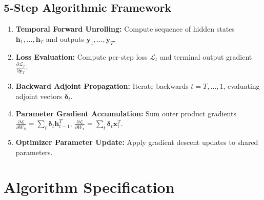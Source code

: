 \documentclass[11pt,a4paper]{article}
\theoremstyle{definition}
\begin{document}
\subsection{5-Step Algorithmic Framework}
\begin{enumerate}
    \item \textbf{Temporal Forward Unrolling:} Compute sequence of hidden states $\mathbf{h}_1, \dots, \mathbf{h}_T$ and outputs $\mathbf{y}_1, \dots, \mathbf{y}_T$.
    \item \textbf{Loss Evaluation:} Compute per-step loss $\mathcal{L}_t$ and terminal output gradient $\frac{\partial \mathcal{L}_T}{\partial \mathbf{y}_T}$.
    \item \textbf{Backward Adjoint Propagation:} Iterate backwards $t = T, \dots, 1$, evaluating adjoint vectors $\boldsymbol{\delta}_t$.
    \item \textbf{Parameter Gradient Accumulation:} Sum outer product gradients $\frac{\partial \mathcal{L}}{\partial W_h} = \sum_t \boldsymbol{\delta}_t \mathbf{h}_{t-1}^T$, $\frac{\partial \mathcal{L}}{\partial W_x} = \sum_t \boldsymbol{\delta}_t \mathbf{x}_t^T$.
    \item \textbf{Optimizer Parameter Update:} Apply gradient descent updates to shared parameters.
\end{enumerate}

\section{Algorithm Specification}
\end{document}
